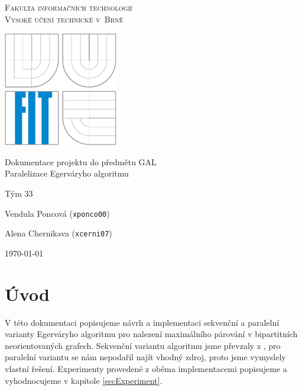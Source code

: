 \documentclass[a4paper, 11pt, titlepage, final]{article}[3. prosinec 2011]
\begin{document}

\begin{titlepage}
\begin{center}

\textsc{
\Large Fakulta informačních technologií 
\medskip\\
Vysoké učení technické v~Brně}


{\parbox{5cm}{\centering\includegraphics[height=5cm]{img/logo.eps}}}


{\LARGE Dokumentace projektu do předmětu GAL} \medskip \\
{\Large Paralelizace Egerváryho algoritmu} 



\end{center}

{\large
Tým 33

Vendula Poncová (\texttt{xponco00})

Alena Chernikava (\texttt{xcerni07})
} \hfill {\large\today}

\end{titlepage}


\setcounter{page}{1}

\section{Úvod}

V této dokumentaci popisujeme návrh a implementaci sekvenční a paralelní varianty Egerváryho algoritmu pro nalezení maximálního párování v bipartitních neorientovaných grafech. Sekvenční variantu algoritmu jsme převzaly z \cite{bondy:2008}, pro paralelní variantu se nám nepodařil najít vhodný zdroj, proto jsme vymyslely vlastní řešení. Experimenty provedené z oběma implementacemi popisujeme a vyhodnocujeme v kapitole \ref{secExperiment}.
\end{document}

